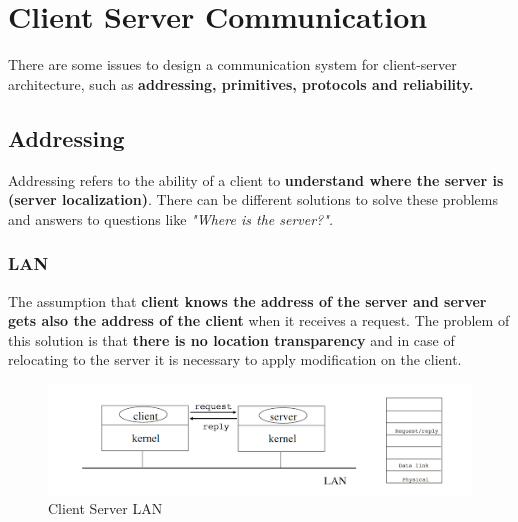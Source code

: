 \chapter{Client Server Communication}
There are some issues to design a communication system for client-server architecture, such as \textbf{addressing, primitives, protocols and reliability.}

\section{Addressing}
Addressing refers to the ability of a client to \textbf{understand where the server is (server localization)}. There can be different solutions to solve these problems and answers to questions like \textit{"Where is the server?".}

\subsection{LAN}
The assumption that \textbf{client knows the address of the server and server gets also the address of the client} when it receives a request. The problem of this solution is that \textbf{there is no location transparency} and in case of relocating to the server it is necessary to apply modification on the client.
\begin{figure}[!h]
            \centering
            \includegraphics[width=.7\linewidth]{images/clientServerCommunication/clientServerLan.png}
            \caption{Client Server LAN}
    \end{figure}

